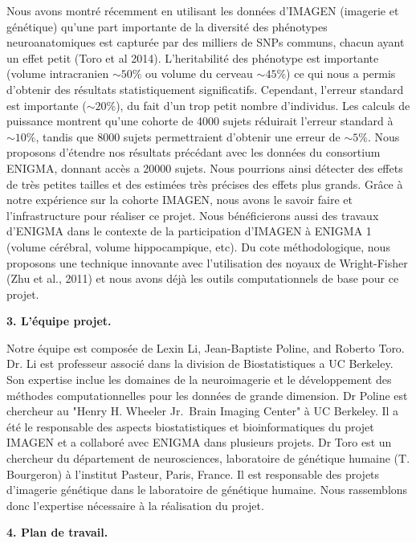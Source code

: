 \documentclass[11pt]{article}
\begin{document}
\noindent
Nous avons montré récemment en utilisant les données d'IMAGEN (imagerie et génétique) qu'une part importante de la diversité des phénotypes neuroanatomiques est capturée par des milliers de SNPs communs, chacun ayant un effet petit (Toro et al 2014). L'heritabilité des phénotype est importante (volume intracranien $\sim 50\%$ ou volume du cerveau $\sim 45\%$) ce qui nous a permis d'obtenir des résultats statistiquement significatifs. Cependant, l'erreur standard est importante  ($\sim 20\%$), du fait d'un trop petit nombre d'individus. Les calculs de puissance montrent qu'une cohorte de 4000 sujets réduirait l'erreur standard à $\sim 10\%$, tandis que 8000 sujets permettraient d'obtenir une erreur de $\sim 5\%$. Nous proposons d'étendre nos résultats précédant avec les données du consortium ENIGMA, donnant accès a 20000 sujets. Nous pourrions ainsi détecter des effets de très petites tailles et des estimées très précises des effets plus grands. Grâce à notre expérience sur la cohorte IMAGEN, nous avons le savoir faire et l'infrastructure pour réaliser ce projet. Nous bénéficierons aussi des travaux d'ENIGMA dans le contexte de la participation d'IMAGEN à ENIGMA 1 (volume cérébral, volume hippocampique, etc). Du cote méthodologique, nous proposons une technique innovante avec l'utilisation des noyaux de  Wright-Fisher (Zhu et al., 2011) et nous avons déjà les outils computationnels de base pour ce projet.
\bigskip

\noindent
{\large \textbf{3. L'équipe projet.}}
\medskip

\noindent
Notre équipe est composée de Lexin Li, Jean-Baptiste Poline, and Roberto Toro. Dr. Li est professeur associé dans la division de Biostatistiques a UC Berkeley. Son expertise inclue les domaines de la neuroimagerie et le développement des méthodes computationnelles pour les données de grande dimension. Dr Poline est chercheur au "Henry H. Wheeler Jr.\ Brain Imaging Center" à UC Berkeley. Il a été le responsable des aspects biostatistiques et bioinformatiques du projet IMAGEN et a collaboré avec ENIGMA dans plusieurs projets. Dr Toro est un chercheur du département de neurosciences, laboratoire de génétique humaine (T. Bourgeron) à l'institut Pasteur, Paris, France. Il est responsable des projets d'imagerie génétique dans le laboratoire de génétique humaine. Nous rassemblons donc l'expertise nécessaire à la réalisation du projet.  
\bigskip



\noindent
{\large \textbf{4. Plan de travail.}}
\medskip
\end{document}
